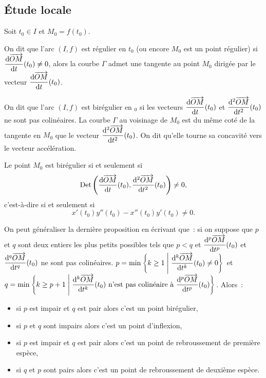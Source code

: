 \subsection{Étude locale}
Soit $t_0 \in I$ et $M_0=f(t_0)$.
\begin{defdef}
 On dit que l'arc $(I,f)$ est régulier en $t_0$ (ou encore $M_0$ est un point régulier) si $\dfrac{\mathrm{d} \overrightarrow{OM}}{\mathrm{d} t}(t_0) \neq 0$, alors la courbe $\Gamma$ admet une tangente au point $M_0$ dirigée par le vecteur $\dfrac{\mathrm{d} \overrightarrow{OM}}{\mathrm{d} t}(t_0)$.%
\end{defdef}
\begin{defdef}
 On dit que l'arc $(I,f)$ est birégulier en $_0$ si les vecteurs $\dfrac{\mathrm{d} \overrightarrow{OM}}{\mathrm{d} t}(t_0)$ et $\dfrac{\mathrm{d}^2 \overrightarrow{OM}}{\mathrm{d} {t}^2}(t_0)$ ne sont pas colinéaires. La courbe $\Gamma$ au voisinage de $M_0$ est du même coté de la tangente en $M_0$ que le vecteur $\dfrac{\mathrm{d}^2 \overrightarrow{OM}}{\mathrm{d} {t}^2}(t_0)$. On dit qu'elle \og tourne sa concavité\fg{} vers le vecteur accélération.
\end{defdef}
\begin{prop}
 Le point $M_0$ est birégulier si et seulement si
 \begin{equation}
  \operatorname{Det}\left(\dfrac{\mathrm{d} \overrightarrow{OM}}{\mathrm{d} t}(t_0),\dfrac{\mathrm{d}^2 \overrightarrow{OM}}{\mathrm{d} {t}^2}(t_0)\right) \neq 0,
 \end{equation}
 c'est-à-dire si et seulement si
 \begin{equation}
  x'(t_0)y''(t_0) - x''(t_0)y'(t_0) \neq 0.
 \end{equation}
\end{prop}
On peut généraliser la dernière proposition en écrivant que~: si on suppose que $p$ et $q$ sont deux entiers les plus petits possibles tels que $p<q$ et $\dfrac{\mathrm{d}^p \overrightarrow{OM}}{\mathrm{d} t^p}(t_0)$ et $\dfrac{\mathrm{d}^q \overrightarrow{OM}}{\mathrm{d} t^q}(t_0)$ ne sont pas colinéaires. $p=\min\left\{k\geq 1\mathrel{}\middle|\mathrel{}\dfrac{\mathrm{d}^k \overrightarrow{OM}}{\mathrm{d} t^k}(t_0) \neq 0\right\}$ et $q=\min\left\{k\geq p+1\mathrel{}\middle|\mathrel{}\dfrac{\mathrm{d}^k \overrightarrow{OM}}{\mathrm{d} t^k}(t_0) \text{~n'est pas colinéaire à~} \dfrac{\mathrm{d}^p \overrightarrow{OM}}{\mathrm{d} t^p}(t_0)\right\}$. Alors~:
\begin{itemize}
\item si $p$ est impair et $q$ est pair alors c'est un point birégulier,
\item si $p$ et $q$ sont impairs alors c'est un point d'inflexion,
\item si $p$ est impair et $q$ est pair alors c'est un point de rebroussement de première espèce,
\item si $q$ et $p$ sont pairs alors c'est un point de rebroussement de deuxième espèce.
\end{itemize}
